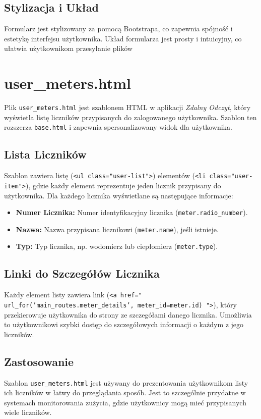 \documentclass[12pt,a4paper]{report}
\begin{document}
\subsection{Stylizacja i Układ}
Formularz jest stylizowany za pomocą Bootstrapa, co zapewnia spójność i estetykę interfejsu użytkownika. Układ formularza jest prosty i intuicyjny, co ułatwia użytkownikom przesyłanie plików


\section{user\_meters.html}
\label{sec:usermeters}
Plik \texttt{user\_meters.html} jest szablonem HTML w aplikacji \textit{Zdalny Odczyt}, który wyświetla listę liczników przypisanych do zalogowanego użytkownika. Szablon ten rozszerza \texttt{base.html} i zapewnia spersonalizowany widok dla użytkownika.

\subsection{Lista Liczników}
Szablon zawiera listę (\texttt{<ul class="user-list">}) elementów (\texttt{<li class="user-item">}), gdzie każdy element reprezentuje jeden licznik przypisany do użytkownika. Dla każdego licznika wyświetlane są następujące informacje:
\begin{itemize}
\item \textbf{Numer Licznika:} Numer identyfikacyjny licznika (\texttt{meter.radio\_number}).
\item \textbf{Nazwa:} Nazwa przypisana licznikowi (\texttt{meter.name}), jeśli istnieje.
\item \textbf{Typ:} Typ licznika, np. wodomierz lub ciepłomierz (\texttt{meter.type}).
\end{itemize}

\subsection{Linki do Szczegółów Licznika}
Każdy element listy zawiera link (\texttt{<a href="{{ url\_for('main\_routes.meter\_details', meter\_id=meter.id) }}">}), który przekierowuje użytkownika do strony ze szczegółami danego licznika. Umożliwia to użytkownikowi szybki dostęp do szczegółowych informacji o każdym z jego liczników.

\subsection{Zastosowanie}
Szablon \texttt{user\_meters.html} jest używany do prezentowania użytkownikom listy ich liczników w łatwy do przeglądania sposób. Jest to szczególnie przydatne w systemach monitorowania zużycia, gdzie użytkownicy mogą mieć przypisanych wiele liczników.
\end{document}
